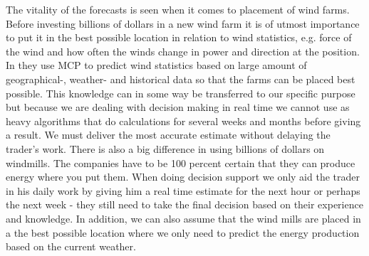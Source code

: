 The vitality of the forecasts is seen when it comes to placement of wind farms. Before investing billions of dollars in a new wind farm it is of utmost importance to put it in the best possible location in relation to wind statistics, e.g. force of the wind and how often the winds change in power and direction at the position. In \cite{4} they use MCP to predict wind statistics based on large amount of geographical-, weather- and historical data so that the farms can be placed best possible. This knowledge can in some way be transferred to our specific purpose but because we are dealing with decision making in real time we cannot use as heavy algorithms that do calculations for several weeks and months before giving a result. We must deliver the most accurate estimate without delaying the trader's work.
There is also a big difference in using billions of dollars on windmills. The companies have to be 100 percent certain that they can produce energy where you put them. When doing decision support we only aid the trader in his daily work by giving him a real time estimate for the next hour or perhaps the next week - they still need to take the final decision based on their experience and knowledge. In addition, we can also assume that the wind mills are placed in a the best possible location where we only need to predict the energy production based on the current weather.